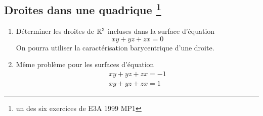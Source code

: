 
\subsection*{Droites dans une quadrique \footnote{un des six exercices de E3A 1999 MP1}}
\begin{enumerate}
\item Déterminer les droites de $\Bbb{R}^{3}$ incluses dans la surface d'équation
\[xy+yz+zx=0\]
On pourra utiliser la caractérisation barycentrique d'une droite.
\item Même problème pour les surfaces d'équation
\begin{eqnarray*}
xy+yz+zx=-1\\
xy+yz+zx=1
\end{eqnarray*}

\end{enumerate}


